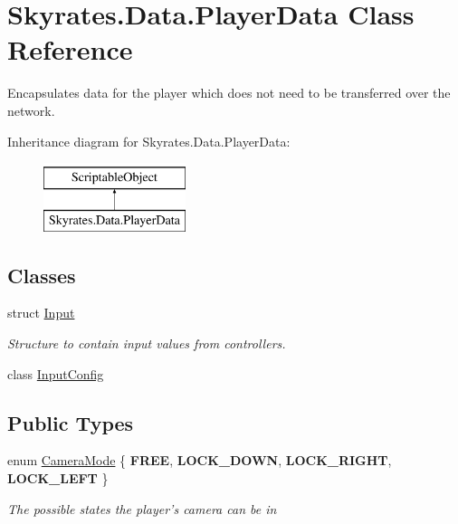 \hypertarget{class_skyrates_1_1_data_1_1_player_data}{\section{Skyrates.\-Data.\-Player\-Data Class Reference}
\label{class_skyrates_1_1_data_1_1_player_data}
}


Encapsulates data for the player which does not need to be transferred over the network.  


Inheritance diagram for Skyrates.\-Data.\-Player\-Data\-:\begin{figure}[H]
\begin{center}
\leavevmode
\includegraphics[height=2.000000cm]{class_skyrates_1_1_data_1_1_player_data}
\end{center}
\end{figure}
\subsection*{Classes}
\begin{DoxyCompactItemize}
\item 
struct \hyperlink{struct_skyrates_1_1_data_1_1_player_data_1_1_input}{Input}
\begin{DoxyCompactList}\small\item\em Structure to contain input values from controllers. \end{DoxyCompactList}\item 
class \hyperlink{class_skyrates_1_1_data_1_1_player_data_1_1_input_config}{Input\-Config}
\end{DoxyCompactItemize}
\subsection*{Public Types}
\begin{DoxyCompactItemize}
\item 
enum \hyperlink{class_skyrates_1_1_data_1_1_player_data_ac28ce79e15521123667443435b1554ea}{Camera\-Mode} \{ {\bfseries F\-R\-E\-E}, 
{\bfseries L\-O\-C\-K\-\_\-\-D\-O\-W\-N}, 
{\bfseries L\-O\-C\-K\-\_\-\-R\-I\-G\-H\-T}, 
{\bfseries L\-O\-C\-K\-\_\-\-L\-E\-F\-T}
 \}
\begin{DoxyCompactList}\small\item\em The possible states the player's camera can be in \end{DoxyCompactList}\end{DoxyCompactItemize}
